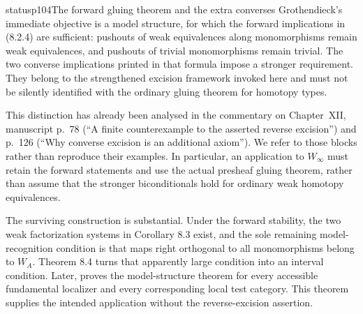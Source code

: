 \begin{dcomment}{status}{p104}{The forward gluing theorem and the extra converses}
Grothendieck's immediate objective is a model structure, for which the forward implications in (8.2.4) are sufficient: pushouts of weak equivalences along monomorphisms remain weak equivalences, and pushouts of trivial monomorphisms remain trivial. The two converse implications printed in that formula impose a stronger requirement. They belong to the strengthened excision framework invoked here and must not be silently identified with the ordinary gluing theorem for homotopy types.

This distinction has already been analysed in the commentary on Chapter~XII, manuscript p.~78 (``A finite counterexample to the asserted reverse excision'') and p.~126 (``Why converse excision is an additional axiom''). We refer to those blocks rather than reproduce their examples. In particular, an application to $W_\infty$ must retain the forward statements and use the actual presheaf gluing theorem, rather than assume that the stronger biconditionals hold for ordinary weak homotopy equivalences.

The surviving construction is substantial. Under the forward stability, the two weak factorization systems in Corollary 8.3 exist, and the sole remaining model-recognition condition is that maps right orthogonal to all monomorphisms belong to $W_A$. Theorem 8.4 turns that apparently large condition into an interval condition. Later, \citet[Corollary 4.2.18]{Cisinski2006} proves the model-structure theorem for every accessible fundamental localizer and every corresponding local test category. This theorem supplies the intended application without the reverse-excision assertion.
\end{dcomment}

